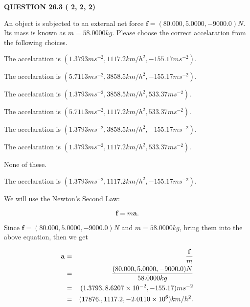 \documentclass[12pt]{article}
\begin{document}
{\textbf{\Large{QUESTION
26.3 
 (          2,          2,          2)
}}}
  
  
 
An object is subjected to an external net force $\mathbf{f}=(
80.000 ,
5.0000,
-9000.0  )N$. Its mass is known as
$m= %
58.0000  kg$. Please choose the correct accelaration
from the following choices.
 
 
 
The accelaration is
$(
1.3793ms^{-2},
1117.2km/h^2,
-155.17ms^{-2}
).
$
 
 
The accelaration is
$(
5.7113ms^{-2},
3858.5km/h^2,
-155.17ms^{-2}
).
$
 
 
The accelaration is
$(
1.3793ms^{-2},
3858.5km/h^2,
533.37ms^{-2}
).
$
 
 
The accelaration is
$(
5.7113ms^{-2},
1117.2km/h^2,
533.37ms^{-2}
).
$
 
 
The accelaration is
$(
1.3793ms^{-2},
3858.5km/h^2,
-155.17ms^{-2}
).
$
 
 
The accelaration is
$(
1.3793ms^{-2},
1117.2km/h^2,
533.37ms^{-2}
).
$
 
 
 None of these.
 
 
\noindent{}
 
 
The accelaration is
$(
1.3793ms^{-2},
1117.2km/h^2,
-155.17ms^{-2}
).
$
 
 
\noindent{}
 
 
 
 
 
 
\noindent{}
 
 

We will use the Newton's Second Law:
 
\[
\mathbf{f}=m\mathbf{a}.
\]
 
Since $\mathbf{f}=( %
80.000,  %
5.0000,  %
-9000.0 )N$
and $m= %
58.0000kg$, bring them into the above equation, then we get
 
\begin{eqnarray*}
\mathbf{a}&=&\frac{\mathbf{f}}m  \\
&=&\frac{(
80.000 ,
5.0000 ,
-9000.0 )N
}{ %
58.0000 kg}  \\
&=&(
1.3793 ,
8.6207 \times 10^{-2},
-155.17
)ms^{-2} \\
&=&(
17876. ,
1117.2 ,
-2.0110 \times 10^{6}
)km/h^2.
\end{eqnarray*}
 
\end{document}
